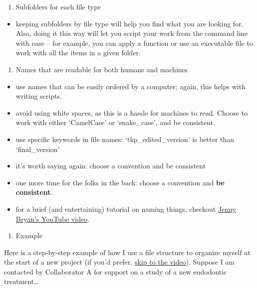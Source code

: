\documentclass[
]{book}
\providecommand{\tightlist}{%
  \setlength{\itemsep}{0pt}\setlength{\parskip}{0pt}}
\begin{document}
\begin{enumerate}
\def\labelenumi{\arabic{enumi}.}
\setcounter{enumi}{1}
\tightlist
\item
  Subfolders for each file type
\end{enumerate}

\begin{itemize}
\tightlist
\item
  keeping subfolders by file type will help you find what you are looking for. Also, doing it this way will let you script your work from the command line with ease -- for example, you can apply a function or use an executable file to work with all the items in a given folder.
\end{itemize}

\begin{enumerate}
\def\labelenumi{\arabic{enumi}.}
\setcounter{enumi}{2}
\tightlist
\item
  Names that are readable for both humans and machines
\end{enumerate}

\begin{itemize}
\tightlist
\item
  use names that can be easily ordered by a computer; again, this helps with writing scripts.
\item
  avoid using white spaces, as this is a hassle for machines to read. Choose to work with either `CamelCase' or `snake\_case', and be consistent.
\item
  use specific keywords in file names: `tkp\_edited\_version' is better than `final\_version'
\item
  it's worth saying again: choose a convention and be consistent
\item
  one more time for the folks in the back: choose a convention and \textbf{be consistent}.
\item
  for a brief (and entertaining) tutorial on naming things, checkout \href{https://www.youtube.com/watch?v=ES1LTlnpLMk}{Jenny Bryan's YouTube video}.
\end{itemize}

\begin{enumerate}
\def\labelenumi{\arabic{enumi}.}
\setcounter{enumi}{3}
\tightlist
\item
  Example
\end{enumerate}

Here is a step-by-step example of how I use a file structure to organize myself at the start of a new project (if you'd prefer, \protect\hyperlink{folder-video}{skip to the video}). Suppose I am contacted by Collaborator A for support on a study of a new endodontic treatment\ldots{}
\end{document}
